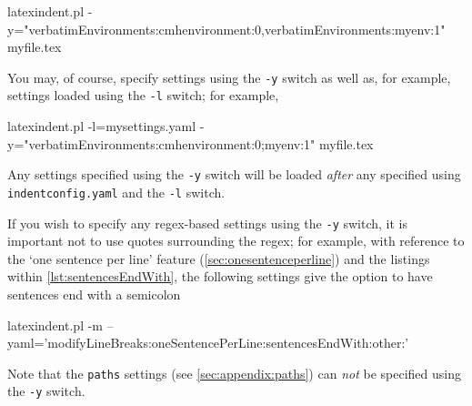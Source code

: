 \documentclass[10pt]{article}
\begin{document}
 \begin{commandshell}
latexindent.pl -y="verbatimEnvironments:cmhenvironment:0,verbatimEnvironments:myenv:1" myfile.tex
\end{commandshell}

 You may, of course, specify settings using the \texttt{-y} switch as well as, for
 example, settings loaded using the \texttt{-l} switch; for example,  

 \begin{commandshell}
latexindent.pl -l=mysettings.yaml -y="verbatimEnvironments:cmhenvironment:0;myenv:1" myfile.tex
\end{commandshell}

 Any settings specified using the \texttt{-y} switch will be loaded \emph{after} any
 specified using \texttt{indentconfig.yaml} and the \texttt{-l} switch.

 If you wish to specify any regex-based settings using the \texttt{-y} switch,
  it is important not to use quotes
 surrounding the regex; for example, with reference to the `one sentence per line'
 feature (\vref{sec:onesentenceperline}) and the listings within
 \vref{lst:sentencesEndWith}, the following settings give the option to have sentences
 end with a semicolon 

 \begin{commandshell}
latexindent.pl -m --yaml='modifyLineBreaks:oneSentencePerLine:sentencesEndWith:other:\;'
\end{commandshell}

 Note that the \texttt{paths} settings (see \vref{sec:appendix:paths}) can \emph{not} be
 specified using the \texttt{-y} switch.
\end{document}
